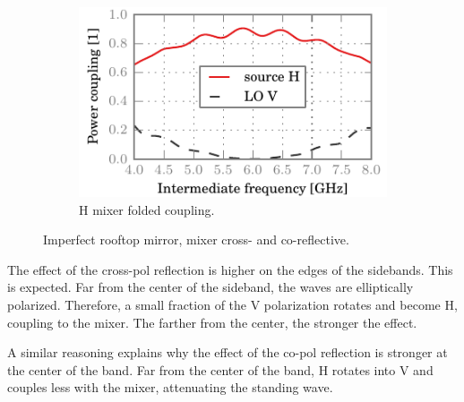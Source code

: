 \begin{figure}[hbtp]
    \\
    \begin{subfigure}[b]{.5\textwidth}
        \includegraphics{chapter_3/09_badrt_mhcrco_h_ssb}%
        \caption{H mixer folded coupling.}
    \end{subfigure}%
    \caption{Imperfect rooftop mirror, mixer cross- and co-reflective.}
    \label{fig:09_badrt_mhcrco}
\end{figure}

The effect of the cross-pol reflection is higher on the edges of the sidebands.
This is expected.
Far from the center of the sideband, the waves are elliptically polarized.
Therefore, a small fraction of the V polarization rotates and become H, coupling to the mixer.
The farther from the center, the stronger the effect.

A similar reasoning explains why the effect of the co-pol reflection is stronger at the center of the band.
Far from the center of the band, H rotates into V and couples less with the mixer, attenuating the standing wave.

\clearpage

